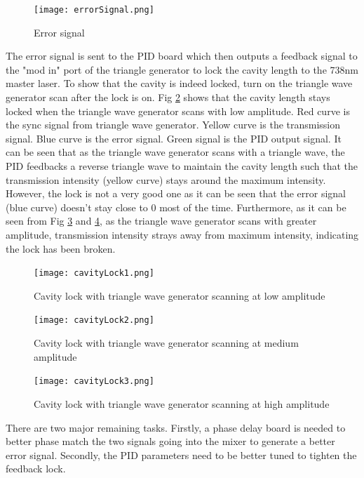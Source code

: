 \documentclass[12pt]{report}
\begin{document}
\begin{figure}[H]
    \centering
    \texttt{[image: errorSignal.png]}
    \caption{Error signal}
    \label{fig:errorSignal}
\end{figure}

The error signal is sent to the PID board which then outputs a feedback signal to the "mod in" port of the triangle generator to lock the cavity length to the 738nm master laser. To show that the cavity is indeed locked, turn on the triangle wave generator scan after the lock is on. Fig \ref{fig:cavityLock1} shows that the cavity length stays locked when the triangle wave generator scans with low amplitude. Red curve is the sync signal from triangle wave generator. Yellow curve is the transmission signal. Blue curve is the error signal. Green signal is the PID output signal. It can be seen that as the triangle wave generator scans with a triangle wave, the PID feedbacks a reverse triangle wave to maintain the cavity length such that the transmission intensity (yellow curve) stays around the maximum intensity. However, the lock is not a very good one as it can be seen that the error signal (blue curve) doesn't stay close to 0 most of the time. Furthermore, as it can be seen from Fig \ref{fig:cavityLock2} and \ref{fig:cavityLock3}, as the triangle wave generator scans with greater amplitude, transmission intensity strays away from maximum intensity, indicating the lock has been broken. 

\begin{figure}[H]
    \centering
    \texttt{[image: cavityLock1.png]}
    \caption{Cavity lock with triangle wave generator scanning at low amplitude}
    \label{fig:cavityLock1}
\end{figure}

\begin{figure}[H]
    \centering
    \texttt{[image: cavityLock2.png]}
    \caption{Cavity lock with triangle wave generator scanning at medium amplitude}
    \label{fig:cavityLock2}
\end{figure}

\begin{figure}[H]
    \centering
    \texttt{[image: cavityLock3.png]}
    \caption{Cavity lock with triangle wave generator scanning at high amplitude}
    \label{fig:cavityLock3}
\end{figure}

There are two major remaining tasks. Firstly, a phase delay board is needed to better phase match the two signals going into the mixer to generate a better error signal. Secondly, the PID parameters need to be better tuned to tighten the feedback lock. 
\end{document}
